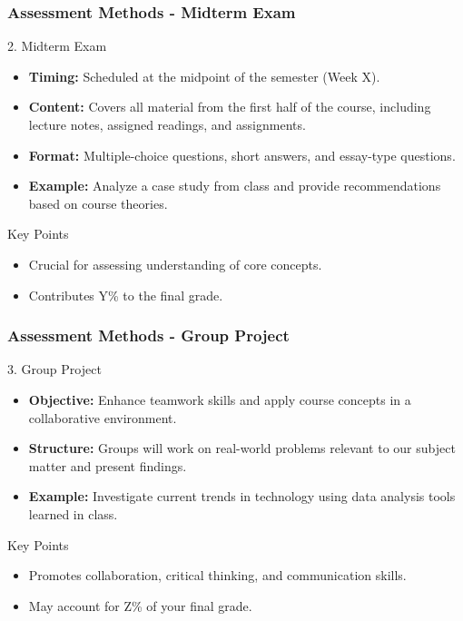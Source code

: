 \documentclass[aspectratio=169]{beamer}
\begin{document}
\begin{frame}[fragile]
    \frametitle{Assessment Methods - Midterm Exam}
    \begin{block}{2. Midterm Exam}
        \begin{itemize}
            \item \textbf{Timing:} Scheduled at the midpoint of the semester (Week X).
            \item \textbf{Content:} Covers all material from the first half of the course, including lecture notes, assigned readings, and assignments.
            \item \textbf{Format:} Multiple-choice questions, short answers, and essay-type questions.
            \item \textbf{Example:} Analyze a case study from class and provide recommendations based on course theories.
        \end{itemize}
    \end{block}
  
    \begin{block}{Key Points}
        \begin{itemize}
            \item Crucial for assessing understanding of core concepts.
            \item Contributes Y\% to the final grade.
        \end{itemize}
    \end{block}
\end{frame}

\begin{frame}[fragile]
    \frametitle{Assessment Methods - Group Project}
    \begin{block}{3. Group Project}
        \begin{itemize}
            \item \textbf{Objective:} Enhance teamwork skills and apply course concepts in a collaborative environment.
            \item \textbf{Structure:} Groups will work on real-world problems relevant to our subject matter and present findings.
            \item \textbf{Example:} Investigate current trends in technology using data analysis tools learned in class.
        \end{itemize}
    \end{block}
  
    \begin{block}{Key Points}
        \begin{itemize}
            \item Promotes collaboration, critical thinking, and communication skills.
            \item May account for Z\% of your final grade.
        \end{itemize}
    \end{block}
\end{frame}
\end{document}
